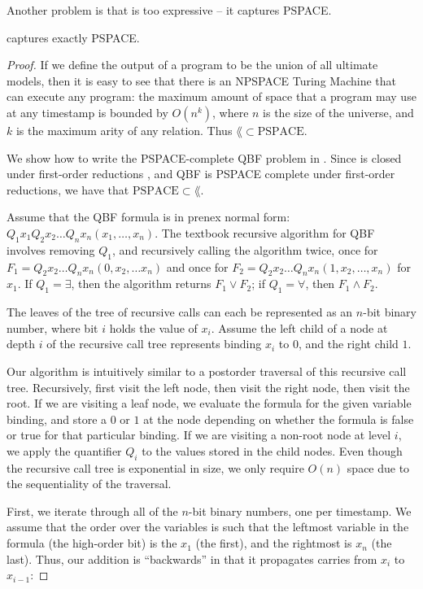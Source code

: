 Another problem is that \lang is too expressive -- it captures PSPACE.  

\begin{lemma}
\label{lem:lang-pspace}
\lang captures exactly PSPACE.
\end{lemma}
\begin{proof}
If we define the output of a \lang program to be the union of all ultimate models, then it is easy to see that there is an NPSPACE Turing Machine that can execute any \lang program: the maximum amount of space that a \lang program may use at any timestamp is bounded by $O(n^k)$, where $n$ is the size of the universe, and $k$ is the maximum arity of any relation.  Thus $\lang \subset \text{PSPACE}$.

We show how to write the PSPACE-complete QBF problem in \lang. Since \lang is closed under first-order reductions , and QBF is PSPACE complete under first-order reductions, we have that $\text{PSPACE} \subset \lang$.

Assume that the QBF formula is in prenex normal form: $Q_1 x_1 Q_2 x_2 \ldots Q_n x_n(x_1, \ldots, x_n)$.  The textbook recursive algorithm for QBF  involves removing $Q_1$, and recursively calling the algorithm twice, once for $F_1 = Q_2 x_2 \ldots Q_n x_n(0, x_2, \ldots x_n)$ and once for $F_2 = Q_2 x_2 \ldots Q_n x_n(1, x_2, \ldots, x_n)$ for $x_1$.  If $Q_1 = \exists$, then the algorithm returns $F_1 \lor F_2$; if $Q_1 = \forall$, then $F_1 \land F_2$.

The leaves of the tree of recursive calls can each be represented as an $n$-bit binary number, where bit $i$ holds the value of $x_i$.  Assume the left child of a node at depth $i$ of the recursive call tree represents binding $x_{i}$ to $0$, and the right child $1$.

Our algorithm is intuitively similar to a postorder traversal of this recursive call tree.  Recursively, first visit the left node, then visit the right node, then visit the root.  If we are visiting a leaf node, we evaluate the formula for the given variable binding, and store a $0$ or $1$ at the node depending on whether the formula is false or true for that particular binding.  If we are visiting a non-root node at level $i$, we apply the quantifier $Q_i$ to the values stored in the child nodes.  Even though the recursive call tree is exponential in size, we only require $O(n)$ space due to the sequentiality of the traversal.

First, we iterate through all of the $n$-bit binary numbers, one per timestamp.  We assume that the order over the variables is such that the leftmost variable in the formula (the high-order bit) is the $x_1$ (the first), and the rightmost is $x_n$ (the last).  Thus, our addition is ``backwards'' in that it propagates carries from $x_i$ to $x_{i-1}$:


\end{proof}
